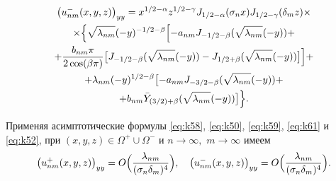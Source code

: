 \begin{multline*}
\bigl( u^-_{nm}(x,y,z)\bigr)_{yy}  =
x^{ 1/2 -\alpha}z^{ 1/2 -\gamma}J_{ 1/2 -\alpha}(\sigma_n x)J_{ 1/2 -\gamma}(\delta_m z)\times
\\
\times
\Bigl\{\sqrt{\lambda_{nm}}(-y)^{- 1/2 -\beta}
\Bigl[-a_{nm}J_{- 1/2 -\beta}(\sqrt{\lambda_{nm}}(-y))+ 
\\
+
\frac{b_{nm}\pi}{2\cos(\beta\pi)}\bigl[J_{- 1/2 -\beta}(\sqrt{\lambda_{nm}}(-y))-J_{ 1/2 +\beta}(\sqrt{\lambda_{nm}}(-y))\bigr]\Bigr]+
\\
+\lambda_{nm}(-y)^{ 1/2 -\beta}\bigl[-a_{nm}J_{-3/2-\beta}(\sqrt{\lambda_{nm}}(-y))+ 
\\
+b_{nm}\bar Y_{(3/2)+\beta}(\sqrt{\lambda_{nm}}(-y))\bigr]\Bigr\}.
\end{multline*}


	Применяя асимптотические формулы \eqref{eq:k58}, \eqref{eq:k50}, \eqref{eq:k59}, \eqref{eq:k61} и \eqref{eq:k52}, при $(x,y,z)\in\Omega^+\cup\Omega^-$ и $n\to\infty, $  $m \to \infty $ имеем
$$
\bigl( u^+_{nm}(x,y,z)\bigr)_{yy}  = O\Bigl(\frac{\lambda _{nm}}{(\sigma_n\delta_m)^4}\Bigr),\quad
\bigl( u^-_{nm}(x,y,z)\bigr)_{yy}  = O\Bigl(\frac{\lambda _{nm}}{(\sigma_n\delta_m)^4}\Bigr).
$$



